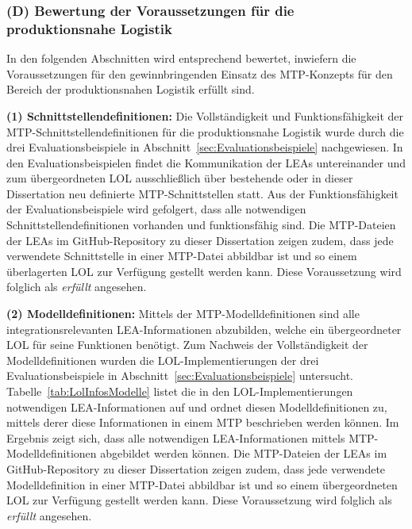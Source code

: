 \subsubsection{(D) Bewertung der Voraussetzungen für die produktionsnahe Logistik}

In den folgenden Abschnitten wird entsprechend bewertet, inwiefern die Voraussetzungen für den gewinnbringenden Einsatz des MTP-Konzepts für den Bereich der produktionsnahen Logistik erfüllt sind.

\textbf{(1) Schnittstellendefinitionen:} Die Vollständigkeit und Funktionsfähigkeit der MTP-Schnittstellendefinitionen für die produktionsnahe Logistik wurde durch die drei Evaluationsbeispiele in Abschnitt~\ref{sec:Evaluationsbeispiele} nachgewiesen. In den Evaluationsbeispielen findet die Kommunikation der LEAs untereinander und zum übergeordneten LOL ausschließlich über bestehende oder in dieser Dissertation neu definierte MTP-Schnittstellen statt. Aus der Funktionsfähigkeit der Evaluationsbeispiele wird gefolgert, dass alle notwendigen Schnittstellendefinitionen vorhanden und funktionsfähig sind. Die MTP-Dateien der LEAs im GitHub-Repository zu dieser Dissertation \cite{Blumenstein.Github} zeigen zudem, dass jede verwendete Schnittstelle in einer MTP-Datei abbildbar ist und so einem über\-la\-ger\-ten LOL zur Verfügung gestellt werden kann. Diese Voraussetzung wird folglich als \emph{erfüllt} angesehen.

\textbf{(2) Modelldefinitionen:} Mittels der MTP-Modelldefinitionen sind alle integrationsrelevanten LEA-Informationen abzubilden, welche ein übergeordneter LOL für seine Funktionen benötigt. Zum Nachweis der Vollständigkeit der Modelldefinitionen wurden die LOL-Implementierungen der drei Evaluationsbeispiele in Abschnitt~\ref{sec:Evaluationsbeispiele} untersucht. Tabelle~\ref{tab:LolInfosModelle} listet die in den LOL-Implementierungen notwendigen LEA-Informationen auf und ordnet diesen Modelldefinitionen zu, mittels derer diese Informationen in einem MTP beschrieben werden können. Im Ergebnis zeigt sich, dass alle notwendigen LEA-Informationen mittels MTP-Modelldefinitionen abgebildet werden können. Die MTP-Dateien der LEAs im GitHub-Repository zu dieser Dissertation \cite{Blumenstein.Github} zeigen zudem, dass jede verwendete Modelldefinition in einer MTP-Datei abbildbar ist und so einem übergeordneten LOL zur Verfügung gestellt werden kann. Diese Voraussetzung wird folglich als \emph{erfüllt} angesehen.

